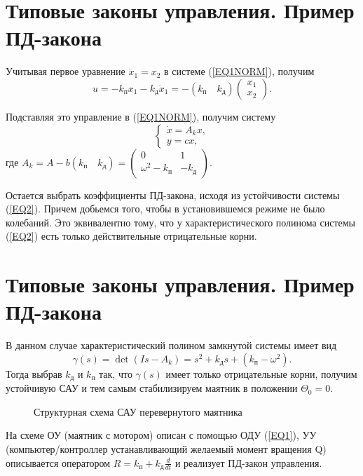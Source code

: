 \documentclass[../TAU.tex]{subfiles}
\theoremstyle{plain}
\theoremstyle{definition}
\theoremstyle{remark}
\theoremstyle{plain}
\newcommand{\eref}[1]{(\ref{#1})}
\begin{document}
\section{Типовые законы управления. Пример ПД-закона}

Учитывая первое уравнение $\dot x_1 = x_2$ в системе \eref{EQ1NORM}, получим
$$
u = - k_п x_1 - k_д \dot x_1 = - (k_п\quad k_д) \begin{pmatrix}x_1 \\ x_2\end{pmatrix}.
$$

Подставляя это управление в \eref{EQ1NORM}, получим систему
\begin{equation}\label{EQ2}
\begin{cases}
\dot x = A_kx,\\
y = c x,
\end{cases}
\end{equation}
где $A_k = A - b(k_п\quad k_д)=\begin{pmatrix}0 & 1\\ \omega^2 - k_п& - k_д\end{pmatrix}$.

Остается выбрать коэффициенты ПД-закона, исходя из устойчивости системы \eref{EQ2}. Причем добьемся того, чтобы в установившемся режиме не было колебаний. Это эквивалентно тому, что у характеристического полинома системы \eref{EQ2} есть только действительные отрицательные корни.




\section{Типовые законы управления. Пример ПД-закона}
В данном случае характеристический полином замкнутой системы имеет вид
$$
\gamma(s) = \det (Is-A_k) = s^2+ k_дs+(k_п-\omega^2).
$$
Тогда выбрав $k_д$ и $k_п$ так, что $\gamma(s)$ имеет только отрицательные корни, получим устойчивую САУ и тем самым стабилизируем маятник в положении $\Theta_0 = 0$.

\begin{figure}
\centering
{}
\centering
\caption{Структурная схема САУ перевернутого маятника}
\end{figure}
На схеме ОУ (маятник с мотором) описан с помощью ОДУ \eref{EQ1}, УУ (компьютер/контроллер устанавливающий желаемый момент вращения Q) описывается оператором $R = k_п+k_д\frac{d}{dt}$ и реализует ПД-закон управления.
\end{document}
